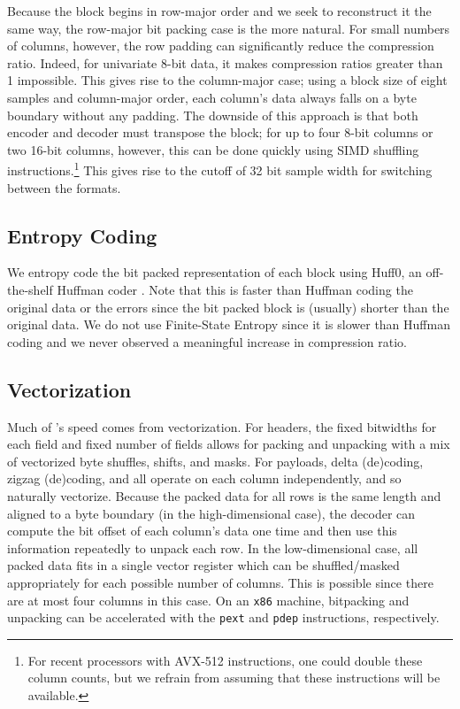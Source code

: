 Because the block begins in row-major order and we seek to reconstruct it the same way, the row-major bit packing case is the more natural. For small numbers of columns, however, the row padding can significantly reduce the compression ratio. Indeed, for univariate 8-bit data, it makes compression ratios greater than 1 impossible. This gives rise to the column-major case; using a block size of eight samples and column-major order, each column's data always falls on a byte boundary without any padding. The downside of this approach is that both encoder and decoder must transpose the block; for up to four 8-bit columns or two 16-bit columns, however, this can be done quickly using SIMD shuffling instructions.\footnote{For recent processors with AVX-512 instructions, one could double these column counts, but we refrain from assuming that these instructions will be available.} This gives rise to the cutoff of 32 bit sample width for switching between the formats.

\subsection{Entropy Coding}

We entropy code the bit packed representation of each block using Huff0, an off-the-shelf Huffman coder \cite{fse}. Note that this is faster than Huffman coding the original data or the errors since the bit packed block is (usually) shorter than the original data. We do not use Finite-State Entropy \cite{fse} since it is slower than Huffman coding and we never observed a meaningful increase in compression ratio.

\subsection{Vectorization}

Much of \mine's speed comes from vectorization. For headers, the fixed bitwidths for each field and fixed number of fields allows for packing and unpacking with a mix of vectorized byte shuffles, shifts, and masks. For payloads, delta (de)coding, zigzag (de)coding, and \fire all operate on each column independently, and so naturally vectorize. Because the packed data for all rows is the same length and aligned to a byte boundary (in the high-dimensional case), the decoder can compute the bit offset of each column's data one time and then use this information repeatedly to unpack each row. In the low-dimensional case, all packed data fits in a single vector register which can be shuffled/masked appropriately for each possible number of columns. This is possible since there are at most four columns in this case. On an \texttt{x86} machine, bitpacking and unpacking can be accelerated with the \texttt{pext} and \texttt{pdep} instructions, respectively.
